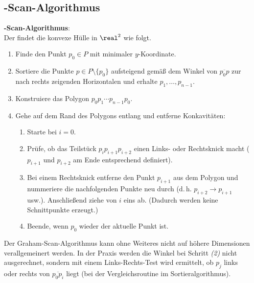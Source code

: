\subsection{%
    -Scan-Algorithmus%
}

\textbf{-Scan-Algorithmus}:\\
Der  findet die konvexe Hülle in $\real^2$ wie folgt.
\begin{enumerate}
    \item
    Finde den Punkt $p_0 \in P$ mit minimaler $y$-Koordinate.

    \item
    Sortiere die Punkte $p \in P \setminus \{p_0\}$ aufsteigend gemäß dem Winkel
    von $\overline{p_0 p}$ zur nach rechts zeigenden Horizontalen und erhalte
    $p_1, \dotsc, p_{n-1}$.

    \item
    Konstruiere das Polygon $p_0 p_1 \dotsb p_{n-1} p_0$.

    \item
    Gehe auf dem Rand des Polygons entlang und entferne Konkavitäten:
    \begin{enumerate}[label=\emph{(\roman*)}]
        \item
        Starte bei $i = 0$.

        \item
        Prüfe, ob das Teilstück $p_i p_{i+1} p_{i+2}$ einen Links- oder Rechtsknick macht
        ($p_{i+1}$ und $p_{i+2}$ am Ende entsprechend definiert).

        \item
        Bei einem Rechtsknick entferne den Punkt $p_{i+1}$ aus dem Polygon und
        nummeriere die nachfolgenden Punkte neu durch (d.\,h. $p_{i+2} \rightarrow p_{i+1}$ usw.).
        Anschließend ziehe von $i$ eins ab.
        (Dadurch werden keine Schnittpunkte erzeugt.)

        \item
        Beende, wenn $p_0$ wieder der aktuelle Punkt ist.
    \end{enumerate}
\end{enumerate}
Der Graham-Scan-Algorithmus kann ohne Weiteres nicht auf höhere Dimensionen verallgemeinert werden.
In der Praxis werden die Winkel bei Schritt \emph{(2)} nicht ausgerechnet, sondern
mit einem Links-Rechts-Test wird ermittelt, ob $p_j$ links oder rechts von $\overline{p_0 p_i}$
liegt (bei der Vergleichsroutine im Sortieralgorithmus).

